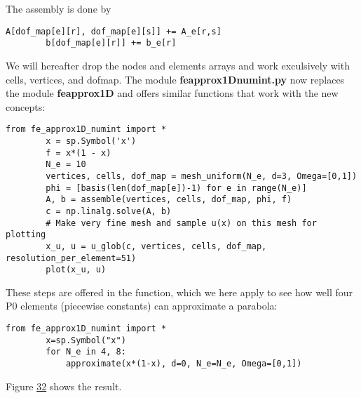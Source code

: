 \documentclass[../main.tex]{subfiles}
\begin{document}
	The assembly is done by
	\begin{lstlisting}[numbers=none]
		A[dof_map[e][r], dof_map[e][s]] += A_e[r,s]
		b[dof_map[e][r]] += b_e[r]	
	\end{lstlisting}
	We will hereafter drop the nodes and elements arrays and work exculsively
	with cells, vertices, and dof\textunderscore map. The module \textbf{fe\textunderscore approx1D\textunderscore numint.py} 
	now replaces the module \textbf{fe\textunderscore approx1D}  and offers similar functions that work
	with the new concepts:
	\begin{lstlisting}[numbers=none]
		from fe_approx1D_numint import *
		x = sp.Symbol('x')
		f = x*(1 - x)
		N_e = 10
		vertices, cells, dof_map = mesh_uniform(N_e, d=3, Omega=[0,1])
		phi = [basis(len(dof_map[e])-1) for e in range(N_e)]
		A, b = assemble(vertices, cells, dof_map, phi, f)
		c = np.linalg.solve(A, b)
		# Make very fine mesh and sample u(x) on this mesh for plotting
		x_u, u = u_glob(c, vertices, cells, dof_map, resolution_per_element=51)
		plot(x_u, u)	
	\end{lstlisting}
	These steps are offered in the  function, which we here apply to see
	how well four P0 elements (piecewise constants) can approximate a parabola:
	\begin{lstlisting}[numbers=none]
		from fe_approx1D_numint import *
		x=sp.Symbol("x")
		for N_e in 4, 8:
			approximate(x*(1-x), d=0, N_e=N_e, Omega=[0,1])	
	\end{lstlisting}
	Figure \hyperref[fig:img_32]{32} shows the result.
	
\end{document}
